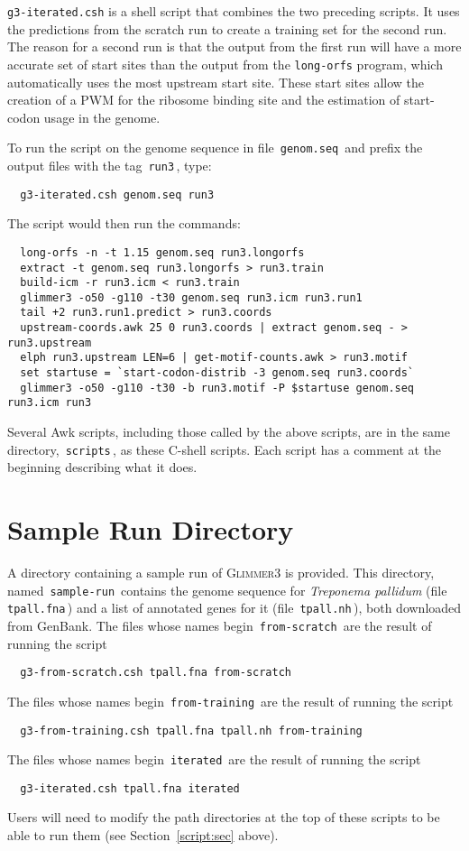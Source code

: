 \documentclass[fleqn,titlepage,11pt]{article}
\def\Gthree{\textsc{Glimmer3}}
\def\Pg#1{\texttt{#1}}
\begin{document}
\exdent
  \Pg{g3-iterated.csh} is a shell script that combines
  the two preceding scripts.  It uses the predictions from
  the scratch run to create a training set for the second run.
  The reason for a second run is that the output from the
  first run will have a more accurate set of start sites than
  the output from the \Pg{long-orfs} program, which automatically
  uses the most upstream start site.  These start sites allow the
  creation of a PWM for the ribosome binding site and the estimation
  of start-codon usage in the genome.

  To run the script on the genome sequence in file
  \,\verb`genom.seq`\, and prefix the output files with the tag
  \,\verb`run3`\,, type:
\BSV\begin{verbatim}
  g3-iterated.csh genom.seq run3
\end{verbatim}\ESV
  The script would then run the commands:
\BSV\begin{verbatim}
  long-orfs -n -t 1.15 genom.seq run3.longorfs
  extract -t genom.seq run3.longorfs > run3.train
  build-icm -r run3.icm < run3.train
  glimmer3 -o50 -g110 -t30 genom.seq run3.icm run3.run1
  tail +2 run3.run1.predict > run3.coords
  upstream-coords.awk 25 0 run3.coords | extract genom.seq - > run3.upstream
  elph run3.upstream LEN=6 | get-motif-counts.awk > run3.motif
  set startuse = `start-codon-distrib -3 genom.seq run3.coords`
  glimmer3 -o50 -g110 -t30 -b run3.motif -P $startuse genom.seq run3.icm run3
\end{verbatim}\ESV

\en

Several Awk scripts, including those called by the above scripts, are
in the same directory, \,\verb`scripts`\,, as these
C-shell scripts.  Each script has a comment at the beginning describing
what it does.


\section{Sample Run Directory}

A directory containing a sample run of \Gthree{} is provided.
This directory, named \,\Pg{sample-run}\, contains the genome sequence
for \emph{Treponema pallidum} (file \,\Pg{tpall.fna}\,)
and a list of annotated genes for it (file \,\Pg{tpall.nh}\,),
both downloaded from GenBank.
The files whose names begin \,\Pg{from-scratch}\, are the result of
running the script
\BSV\begin{verbatim}
  g3-from-scratch.csh tpall.fna from-scratch
\end{verbatim}\ESV
The files whose names begin \,\Pg{from-training}\, are the result of
running the script
\BSV\begin{verbatim}
  g3-from-training.csh tpall.fna tpall.nh from-training
\end{verbatim}\ESV
The files whose names begin \,\Pg{iterated}\, are the result of
running the script
\BSV\begin{verbatim}
  g3-iterated.csh tpall.fna iterated
\end{verbatim}\ESV
Users will need to modify the path directories at the top of these
scripts to be able to run them (see Section~\ref{script:sec} above).
\end{document}
